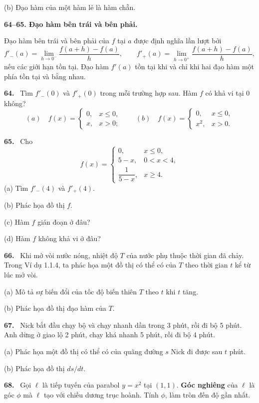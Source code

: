 \documentclass[12pt,a4paper]{article}
\newcommand{\bt}[1]{\par\smallskip\noindent\textbf{#1.}\ }
\newcommand{\group}[1]{\par\medskip\noindent\textbf{#1}\par\nopagebreak[4]}
\begin{document}
(b) Đạo hàm của một hàm lẻ là hàm chẵn.
\group{64–65. Đạo hàm bên trái và bên phải.}
Đạo hàm bên trái và bên phải của $f$ tại $a$ được định nghĩa lần lượt bởi
\[f'_-(a)=\lim_{h\to0^-}\frac{f(a+h)-f(a)}h,\qquad f'_+(a)=\lim_{h\to0^+}\frac{f(a+h)-f(a)}h,\]
nếu các giới hạn tồn tại. Đạo hàm $f'(a)$ tồn tại khi và chỉ khi hai đạo hàm một phía tồn tại và bằng nhau.
\bt{64} Tìm $f'_-(0)$ và $f'_+(0)$ trong mỗi trường hợp sau. Hàm $f$ có khả vi tại 0 không?
\[(a)\quad f(x)=\begin{cases}0,&x\le0,\\x,&x>0;\end{cases}\qquad
(b)\quad f(x)=\begin{cases}0,&x\le0,\\x^2,&x>0.\end{cases}\]
\bt{65} Cho
\[f(x)=\begin{cases}0,&x\le0,\\5-x,&0<x<4,\\\dfrac1{5-x},&x\ge4.\end{cases}\]
(a) Tìm $f'_-(4)$ và $f'_+(4)$.

(b) Phác họa đồ thị $f$.

(c) Hàm $f$ gián đoạn ở đâu?

(d) Hàm $f$ không khả vi ở đâu?
\bt{66} Khi mở vòi nước nóng, nhiệt độ $T$ của nước phụ thuộc thời gian đã chảy. Trong Ví dụ 1.1.4, ta phác họa một đồ thị có thể có của $T$ theo thời gian $t$ kể từ lúc mở vòi.

(a) Mô tả sự biến đổi của tốc độ biến thiên $T$ theo $t$ khi $t$ tăng.

(b) Phác họa đồ thị đạo hàm của $T$.
\bt{67} Nick bắt đầu chạy bộ và chạy nhanh dần trong 3 phút, rồi đi bộ 5 phút. Anh dừng ở giao lộ 2 phút, chạy khá nhanh 5 phút, rồi đi bộ 4 phút.

(a) Phác họa một đồ thị có thể có của quãng đường $s$ Nick đi được sau $t$ phút.

(b) Phác họa đồ thị $ds/dt$.
\bt{68} Gọi $\ell$ là tiếp tuyến của parabol $y=x^2$ tại $(1,1)$. \textbf{Góc nghiêng} của $\ell$ là góc $\phi$ mà $\ell$ tạo với chiều dương trục hoành. Tính $\phi$, làm tròn đến độ gần nhất.
\end{document}
